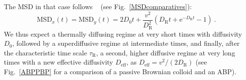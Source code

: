 The MSD in that case follows ~\cite{franke1990galvanotaxis, howse2007selfmotile, martens2012probability} (see Fig.~\ref{MSDcomparatives}):
\begin{equation}
\boxed{
\mathrm{MSD}_x(t) = \mathrm{MSD}_y(t) = 2D_0 t + \dfrac{v^2}{D_\mathrm{R}^2}
\left(D_\mathrm{R} t+\mathrm{e}^{-D_\mathrm{R} t}-1\right)}~.
\label{MSDABP}
\end{equation}
We thus expect a thermally diffusing regime at very short times with diffusivity $D_0$, followed by a superdiffusive regime at intermediate times, and finally, after the characteristic time scale $\tau_\mathrm{R}$, a second, higher diffusive regime at very long times with a new effective diffusivity $D_\mathrm{eff}$, as $D_\mathrm{eff} = v^2/(2D_\mathrm{R})$ (see Fig.~\ref{ABPPBP} for a comparison of a passive Brownian colloid and an ABP).


